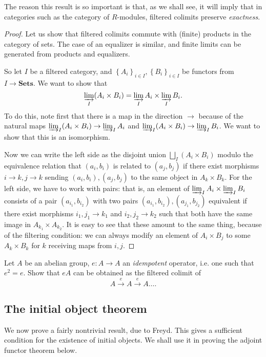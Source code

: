 The reason this result is so important is that, as we shall see, it will imply
that in categories such as the category of $R$-modules, filtered colimits
preserve \emph{exactness}. 
\begin{proof} 
Let us show that filtered colimits commute with (finite) products in the
category of sets. The case of an equalizer is similar, and finite limits can be
generated from products and equalizers.

So let $I$ be a filtered category, and $\left\{A_i\right\}_{i \in I},
\left\{B_i\right\}_{i \in I}$
be functors from $I \to \mathbf{Sets}$. 
We want to show that 
\[ \varinjlim_I (A_i \times B_i) = \varinjlim_I A_i \times \varinjlim_I B_i . \]
To do this, note first that there is a map in the direction $\to$ because of
the natural maps $\varinjlim_I (A_i \times B_i) \to \varinjlim_I A_i$ and
$\varinjlim_I (A_i \times B_i) \to \varinjlim_I B_i$.
We want to show that this is an isomorphism.

Now we can write the left side as the disjoint union $\bigsqcup_I (A_i \times
B_i)$ modulo the equivalence relation that $(a_i, b_i)$ is related to $(a_j,
b_j)$ if there exist morphisms $i \to k, j \to k$ sending $(a_i, b_i), (a_j,
b_j)$ to the same object in $A_k \times B_k$.
For the left side, we have to work with pairs: that is, an element of 
 $\varinjlim_I A_i \times \varinjlim_I B_i$ consists of a pair $(a_{i_1},
 b_{i_2})$
 with two pairs $(a_{i_1}, b_{i_2}), (a_{j_1}, b_{j_2})$ equivalent if there exist
 morphisms $i_1,j_1 \to k_1 $ and $i_2,  j_2 \to k_2$ such that both have the
 same image in $A_{k_1} \times A_{k_2}$. It is easy to see that these amount to
 the same thing, because of the filtering condition: we can always modify an
 element of $A_{i} \times B_{j}$ to some $A_{k} \times B_k$ for $k$ receiving
 maps from $i, j$.
\end{proof} 

\begin{exercise} 
Let $A$ be an abelian group, $e: A \to A$ an \emph{idempotent} operator, i.e.
one such that $e^2 = e$. Show that $eA$ can be obtained as the filtered colimit
of 
\[ A \stackrel{e}{\to} A \stackrel{e}{\to} A \dots.  \]
\end{exercise} 

\subsection{The initial object theorem}

We now prove a fairly nontrivial result, due to Freyd. This gives a sufficient
condition for the existence of initial objects.
We shall use it in proving the adjoint functor theorem below.

